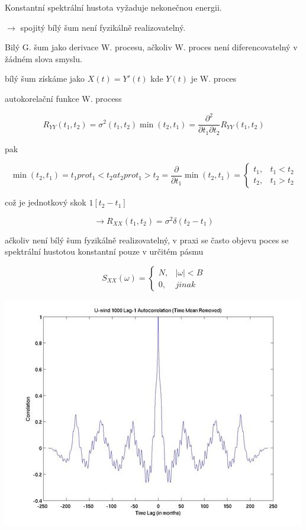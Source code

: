 Konstantní spektrální hustota vyžaduje nekonečnou energii.

$\rightarrow$ spojitý bílý šum není fyzikálně realizovatelný.

Bilý G. šum jako derivace W. procesu, ačkoliv W. proces není diferencovatelný v žádném slova smyslu.

bílý šum získáme jako $X(t) = Y'(t)$ kde $Y(t)$ je W. proces

autokorelační funkce W. process

\[ R_{YY} (t_1,t_2) = \sigma^2 (t_1,t_2) \min (t_2,t_1) = \dfrac{\partial^2}{\partial t_1 \partial t_2} R_{YY} (t_1, t_2) \]

pak

\[ \min (t_2,t_1) = t_1 pro t_1 < t_2 a t_2 pro t_1 > t_2  = \dfrac{\partial}{\partial t_1} \min (t_2,t_1) = \begin{cases} t_1 , & t_1 < t_2 \\ t_2, & t_1 > t_2 \end{cases} \]

což je jednotkový skok $1[t_2-t_1]$

\[ \to R_{XX} (t_1,t_2) = \sigma^2 \delta(t_2-t_1) \]

ačkoliv není bílý šum fyzikálně realizovatelný, v praxi se často objevu poces se spektrální hustotou konstantní pouze v určitém pásmu 


\[ S_{XX} (\omega) = \begin{cases}N, & |\omega| < B \\ 0, & jinak \end{cases} \]

\begin{center}
	\includegraphics[scale=0.2]{obrazky/autocorelation.jpg}
\end{center}
















